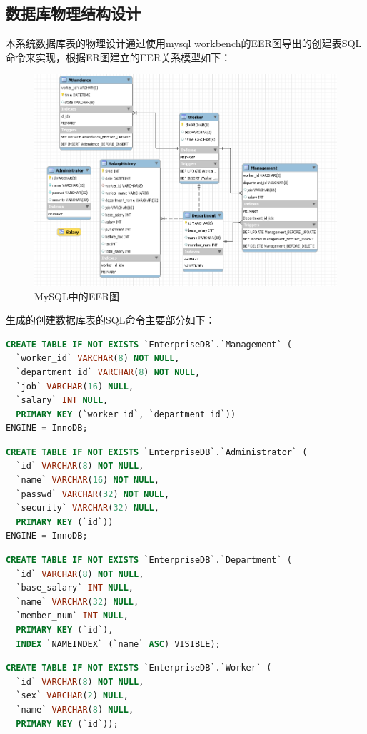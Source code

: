 \documentclass[withoutpreface,bwprint]{cumcmthesis} %
\begin{document}
\subsection{数据库物理结构设计}
本系统数据库表的物理设计通过使用mysql workbench的EER图导出的创建表SQL命令来实现，根据ER图建立的EER关系模型如下：
\begin{figure}[H]
    \centering
    \includegraphics[width=1\linewidth]{EERGraph}
    \caption{MySQL中的EER图}
    \label{EER}
\end{figure}
生成的创建数据库表的SQL命令主要部分如下：
\begin{lstlisting}[language=SQL]
CREATE TABLE IF NOT EXISTS `EnterpriseDB`.`Management` (
  `worker_id` VARCHAR(8) NOT NULL,
  `department_id` VARCHAR(8) NOT NULL,
  `job` VARCHAR(16) NULL,
  `salary` INT NULL,
  PRIMARY KEY (`worker_id`, `department_id`))
ENGINE = InnoDB;
\end{lstlisting}
\begin{lstlisting}[language=SQL]
CREATE TABLE IF NOT EXISTS `EnterpriseDB`.`Administrator` (
  `id` VARCHAR(8) NOT NULL,
  `name` VARCHAR(16) NOT NULL,
  `passwd` VARCHAR(32) NOT NULL,
  `security` VARCHAR(32) NULL,
  PRIMARY KEY (`id`))
ENGINE = InnoDB;
\end{lstlisting}
\begin{lstlisting}[language=SQL]
CREATE TABLE IF NOT EXISTS `EnterpriseDB`.`Department` (
  `id` VARCHAR(8) NOT NULL,
  `base_salary` INT NULL,
  `name` VARCHAR(32) NULL,
  `member_num` INT NULL,
  PRIMARY KEY (`id`),
  INDEX `NAMEINDEX` (`name` ASC) VISIBLE);
\end{lstlisting}
\begin{lstlisting}[language=SQL]
CREATE TABLE IF NOT EXISTS `EnterpriseDB`.`Worker` (
  `id` VARCHAR(8) NOT NULL,
  `sex` VARCHAR(2) NULL,
  `name` VARCHAR(8) NULL,
  PRIMARY KEY (`id`));
\end{lstlisting}
\end{document}
